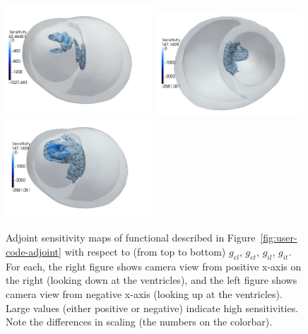 \documentclass[a4paper, reqno]{amsart}
\numberwithin{equation}{section}
\begin{document}
\begin{figure}
  \includegraphics[width=0.49\textwidth]{png/g_il_minusx.png}
  \includegraphics[width=0.49\textwidth]{png/g_it_plusx.png}
  \includegraphics[width=0.49\textwidth]{png/g_it_minusx.png}

\caption{Adjoint sensitivity maps of functional described in
  Figure~\ref{fig:user-code-adjoint} with respect to (from top to
  bottom) $g_{el}$, $g_{et}$, $g_{il}$, $g_{it}$. For each, the right
  figure shows camera view from positive x-axis on the right (looking
  down at the ventricles), and the left figure shows camera view from
  negative x-axis (looking up at the ventricles). Large values (either
  positive or negative) indicate high sensitivities. Note the
  differences in scaling (the numbers on the colorbar). }
\label{fig:sensitivity-maps}
\end{figure}


 
\end{document}
